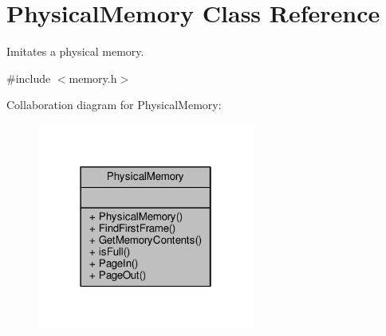 \hypertarget{classPhysicalMemory}{}\section{Physical\+Memory Class Reference}
\label{classPhysicalMemory}


Imitates a physical memory.  




{\ttfamily \#include $<$memory.\+h$>$}



Collaboration diagram for Physical\+Memory\+:
\nopagebreak
\begin{figure}[H]
\begin{center}
\leavevmode
\includegraphics[width=202pt]{classPhysicalMemory__coll__graph}
\end{center}
\end{figure}
